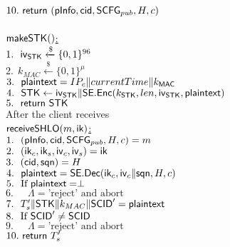  $10.\  \mathsf{return}\ (\mathsf{pInfo}, \mathsf{cid}, \mathsf{SCFG}_{pub}, H, c)$ \\
\\
\underline{$\mathsf{makeSTK}()$:} \\
 $1.\ \ \mathsf{iv}_{\mathsf{STK}} \xleftarrow{\$} \{0,1\}^{96}$ \\
 $2.\ \ k_{MAC} \xleftarrow{\$} \{0,1\}^{\mu}$ \\
 $3.\ \ \mathsf{plaintext} = IP_c \| currentTime \| k_{\mathsf{MAC}}$ \\
 $4.\ \ \mathsf{STK} \leftarrow \mathsf{iv}_{\mathsf{STK}} \| \mathsf{SE}.\mathsf{Enc}(k_{\mathsf{STK}}, len, \mathsf{iv}_{\mathsf{STK}}, \mathsf{plaintext})$ \\
 $5.\ \ \mathsf{return}\ \mathsf{STK}$ \\
%
After the client receives
\\
\noindent
\underline{$\mathsf{receiveSHLO}(m, \mathsf{ik})$:} \\
 $1.\ \ (\mathsf{pInfo}, \mathsf{cid}, \mathsf{SCFG}_{pub}, H, c) = m$ \\
 $2.\ \ (\mathsf{ik}_c, \mathsf{ik}_s, \mathsf{iv}_c, \mathsf{iv}_s) = \mathsf{ik}$ \\
 $3.\ \ (\mathsf{cid}, \mathsf{sqn}) = H$ \\
 $4.\ \ \mathsf{plaintext} = \mathsf{SE}.\mathsf{Dec}(\mathsf{ik}_c, \mathsf{iv}_c \| \mathsf{sqn}, H, c)$ \\
 $5.\ \ \text{If }\mathsf{plaintext} = \perp$ \\
 $6.\ \ \quad \Lambda = \text{'reject' and abort}$ \\
 $7.\ \ T_{s}^{\prime} \| \mathsf{STK} \| k_{MAC} \| \mathsf{SCID}^{\prime} = \mathsf{plaintext} $ \\
 $8.\ \ \text{If }\mathsf{SCID}^{\prime} \neq \mathsf{SCID}$ \\
 $9.\ \ \quad \Lambda = \text{'reject' and abort}$ \\
 $10.\  \mathsf{return}\ T_s^{\prime}$ \\
\\